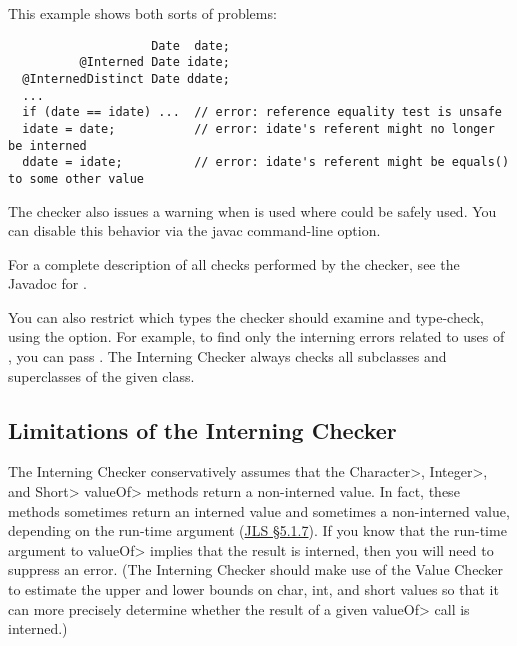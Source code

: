 This example shows both sorts of problems:

\begin{Verbatim}
                    Date  date;
          @Interned Date idate;
  @InternedDistinct Date ddate;
  ...
  if (date == idate) ...  // error: reference equality test is unsafe
  idate = date;           // error: idate's referent might no longer be interned
  ddate = idate;          // error: idate's referent might be equals() to some other value
\end{Verbatim}

\label{lint-dotequals}

The checker also issues a warning when  is used where
\code{==} could be safely used.  You can disable this behavior via the
javac  command-line option.

For a complete description of all checks performed by
  the checker, see the Javadoc for
  .

\label{checking-class}
You can also restrict which types the checker should examine and type-check,
using the  option.  For example, to find only the
interning errors related to uses of , you can pass
.  The Interning Checker always checks all
subclasses and superclasses of the given class.


\subsection{Limitations of the Interning Checker\label{interning-limitations}}


The Interning Checker conservatively assumes that the \<Character>, \<Integer>,
and \<Short> \<valueOf> methods return a non-interned value.  In fact, these
methods sometimes return an interned value and sometimes a non-interned
value, depending on the run-time argument (\href{https://docs.oracle.com/javase/specs/jls/se10/html/jls-5.html#jls-5.1.7}{JLS
\S5.1.7}).  If you know that the run-time argument to \<valueOf> implies that
the result is interned, then you will need to suppress an error.
(The Interning Checker should make use of the Value Checker to estimate the upper
and lower bounds on char, int, and short values so that it can more
precisely determine whether the result of a given \<valueOf> call is
interned.)



